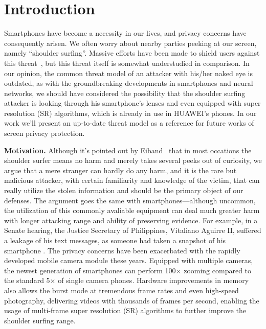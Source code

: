 \section{Introduction}
\label{sec-introduction}

Smartphones have become a necessity in our lives, and privacy concerns have consequently arisen. We often worry about nearby parties peeking at our screen, namely ``shoulder surfing''. Massive efforts have been made to shield users against this threat~\cite{wiedenbeck2006design,papadopoulos2017illusionpin,kumar2007reducing}, but this threat itself is somewhat understudied in comparison. In our opinion, the common threat model of an attacker with his/her naked eye is outdated, as with the groundbreaking developments in smartphones and neural networks, we should have considered the possibility that the shoulder surfing attacker is looking through his smartphone's lenses and even equipped with super resolution (SR) algorithms, which is already in use in HUAWEI's phones. In our work we'll present an up-to-date threat model as a reference for future works of screen privacy protection.

\textbf{Motivation.} Although it's pointed out by Eiband~\cite{eiband2017understanding} that in most occations the shoulder surfer means no harm and merely takes several peeks out of curiosity, we argue that a mere stranger can hardly do any harm, and it is the rare but malicious attacker, with certain familiarity and knowledge of the victim, that can really utilize the stolen information and should be the primary object of our defenses.
The argument goes the same with smartphones---although uncommon, the utilization of this commonly avaliable equipment can deal much greater harm with longer attacking range and ability of preserving evidence. For example, in a Senate hearing, the Justice Secretary of Philippines, Vitaliano Aguirre II, suffered a leakage of his text messages, as someone had taken a snapshot of his smartphone \cite{Polotiko2017leakage}. 
The privacy concerns have been exacerbated with the rapidly developed mobile camera module these years. Equipped with multiple cameras, the newest generation of smartphones can perform 100$\times$ zooming compared to the standard 5$\times$ of single camera phones. Hardware improvements in memory also allows the burst mode at tremendous frame rates and even high-speed photography, delivering videos with thousands of frames per second, enabling the usage of multi-frame super resolution (SR) algorithms to further improve the shoulder surfing range.



